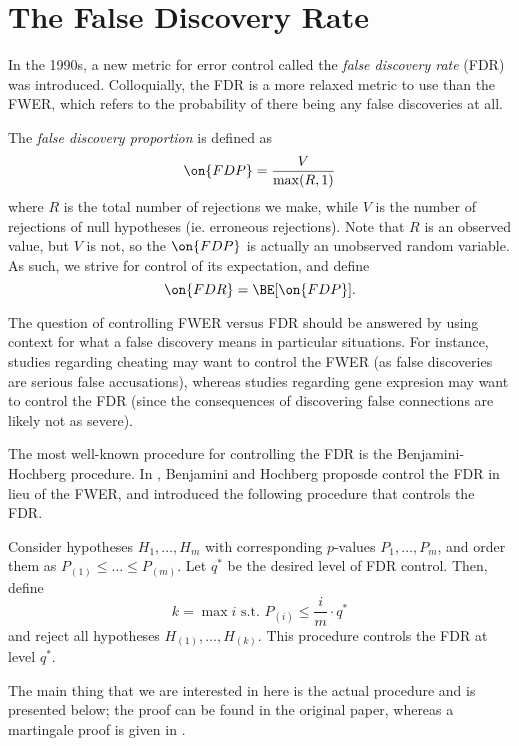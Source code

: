 \documentclass[11pt,reqno]{report}
\theoremstyle{definition}
\numberwithin{equation}{section}
\begin{document}
\section{The False Discovery Rate} 
In the 1990s, a new metric for error control called the \emph{false discovery rate} (FDR) was introduced. Colloquially, the FDR is a more relaxed metric to use than the FWER, which refers to the probability of there being any false discoveries at all.
\begin{defn}
The \emph{false discovery proportion} is defined as
\begin{equation}
\on{FDP} = \frac{V}{\max(R, 1)}
\end{equation}
where $R$ is the total number of rejections we make, while $V$ is the number of rejections of null hypotheses (ie. erroneous rejections). Note that $R$ is an observed value, but $V$ is not, so the $\on{FDP}$ is actually an unobserved random variable. As such, we strive for control of its expectation, and define
\begin{equation}
\on{FDR} = \BE[\on{FDP}].
\end{equation}

\end{defn}
The question of controlling FWER versus FDR should be answered by using context for what a false discovery means in particular situations. For instance, studies regarding cheating may want to control the FWER (as false discoveries are serious false accusations), whereas studies regarding gene expresion may want to control the FDR (since the consequences of discovering false connections are likely not as severe). 

The most well-known procedure for controlling the FDR is the Benjamini-Hochberg procedure. In \cite{bh}, Benjamini and Hochberg proposde control the FDR in lieu of the FWER, and introduced the following procedure that controls the FDR.
\begin{theorem}
Consider hypotheses $H_1, \ldots, H_m$ with corresponding $p$-values $P_1, \ldots, P_m$, and order them as $P_{(1)} \leq \ldots \leq P_{(m)}$. Let $q^*$ be the desired level of FDR control. Then, define
\[ k = \max i \text{ s.t. } P_{(i)} \leq \frac{i}{m} \cdot q^{*} \] and reject all hypotheses $H_{(1)}, \ldots, H_{(k)}$. This procedure controls the FDR at level $q^*$. 
\end{theorem}
The main thing that we are interested in here is the actual procedure and is presented below; the proof can be found in the original paper, whereas a martingale proof is given in \cite{stat300}.
\end{document}
